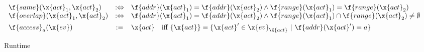 \begin{figure*}
$$\begin{array}{lcll}
\f{same}(\x{act}_1, \x{act}_2) &:\Leftrightarrow& \f{addr}(\x{act}_1) = \f{addr}(\x{act}_2) \wedge \f{range}(\x{act}_1) = \f{range}(\x{act}_2) \\
\f{overlap}(\x{act}_1, \x{act}_2) &:\Leftrightarrow& \f{addr}(\x{act}_1) = \f{addr}(\x{act}_2) \wedge \f{range}(\x{act}_1) \cap \f{range}(\x{act}_2) \neq \emptyset \\
[1ex]
\f{access}_a(\x{ev}) &:=& \x{act} \quad\mbox{iff}~ \{\x{act}\} = \{\x{act}' \in \x{ev}_{\K{act}} ~|~ \f{addr}(\x{act}') = a\} \\
\end{array}
$$

\caption{Runtime}
\label{fig:runtime}

\end{figure*}
